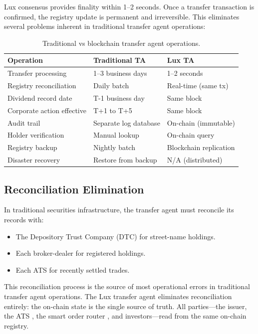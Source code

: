 \documentclass[11pt,a4paper]{article}
\begin{document}
Lux consensus provides finality within 1--2 seconds. Once a transfer transaction is confirmed, the registry update is permanent and irreversible. This eliminates several problems inherent in traditional transfer agent operations:

\begin{table}[H]
\centering
\caption{Traditional vs blockchain transfer agent operations.}
\label{tab:comparison}
\begin{tabular}{lll}
\toprule
\textbf{Operation} & \textbf{Traditional TA} & \textbf{Lux TA} \\
\midrule
Transfer processing & 1--3 business days & 1--2 seconds \\
Registry reconciliation & Daily batch & Real-time (same tx) \\
Dividend record date & T-1 business day & Same block \\
Corporate action effective & T+1 to T+5 & Same block \\
Audit trail & Separate log database & On-chain (immutable) \\
Holder verification & Manual lookup & On-chain query \\
Registry backup & Nightly batch & Blockchain replication \\
Disaster recovery & Restore from backup & N/A (distributed) \\
\bottomrule
\end{tabular}
\end{table}

\subsection{Reconciliation Elimination}

In traditional securities infrastructure, the transfer agent must reconcile its records with:

\begin{itemize}[nosep]
  \item The Depository Trust Company (DTC) for street-name holdings.
  \item Each broker-dealer for registered holdings.
  \item Each ATS for recently settled trades.
\end{itemize}

This reconciliation process is the source of most operational errors in traditional transfer agent operations. The Lux transfer agent eliminates reconciliation entirely: the on-chain state is the single source of truth. All parties---the issuer, the ATS \cite{lux-ats-architecture}, the smart order router \cite{lux-smart-order-routing}, and investors---read from the same on-chain registry.
\end{document}
